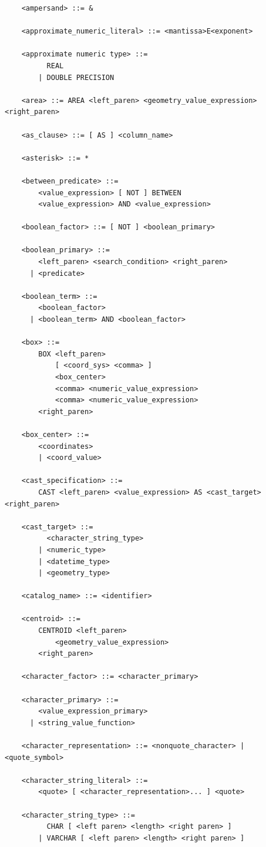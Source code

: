\documentclass[11pt,a4paper]{ivoa}
\begin{document}
\begin{verbatim}
    <ampersand> ::= &

    <approximate_numeric_literal> ::= <mantissa>E<exponent>

    <approximate numeric type> ::=
          REAL
        | DOUBLE PRECISION

    <area> ::= AREA <left_paren> <geometry_value_expression> <right_paren>

    <as_clause> ::= [ AS ] <column_name>

    <asterisk> ::= *

    <between_predicate> ::=
        <value_expression> [ NOT ] BETWEEN
        <value_expression> AND <value_expression>

    <boolean_factor> ::= [ NOT ] <boolean_primary>

    <boolean_primary> ::=
        <left_paren> <search_condition> <right_paren>
      | <predicate>

    <boolean_term> ::=
        <boolean_factor>
      | <boolean_term> AND <boolean_factor>

    <box> ::=
        BOX <left_paren>
            [ <coord_sys> <comma> ]
            <box_center>
            <comma> <numeric_value_expression>
            <comma> <numeric_value_expression>
        <right_paren>
    
    <box_center> ::=
        <coordinates>
        | <coord_value>
    
    <cast_specification> ::=
        CAST <left_paren> <value_expression> AS <cast_target> <right_paren>
    
    <cast_target> ::=
          <character_string_type>
        | <numeric_type>
        | <datetime_type>
        | <geometry_type>

    <catalog_name> ::= <identifier>

    <centroid> ::=
        CENTROID <left_paren>
            <geometry_value_expression>
        <right_paren>

    <character_factor> ::= <character_primary>

    <character_primary> ::=
        <value_expression_primary>
      | <string_value_function>

    <character_representation> ::= <nonquote_character> | <quote_symbol>

    <character_string_literal> ::=
        <quote> [ <character_representation>... ] <quote>

    <character_string_type> ::=
          CHAR [ <left paren> <length> <right paren> ]
        | VARCHAR [ <left paren> <length> <right paren> ]


\end{verbatim}
\end{document}
